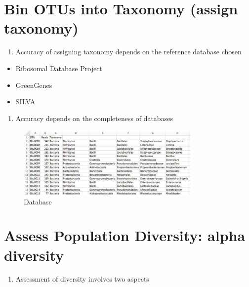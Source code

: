 \documentclass[
]{book}
\providecommand{\tightlist}{%
  \setlength{\itemsep}{0pt}\setlength{\parskip}{0pt}}
\begin{document}
\hypertarget{bin-otus-into-taxonomy-assign-taxonomy}{%
\section{Bin OTUs into Taxonomy (assign taxonomy)}\label{bin-otus-into-taxonomy-assign-taxonomy}}

\begin{enumerate}
\def\labelenumi{\arabic{enumi}.}
\tightlist
\item
  Accuracy of assigning taxonomy depends on the
  reference database chosen
\end{enumerate}

\begin{itemize}
\tightlist
\item
  Ribosomal Database Project
\item
  GreenGenes
\item
  SILVA
\end{itemize}

\begin{enumerate}
\def\labelenumi{\arabic{enumi}.}
\setcounter{enumi}{1}
\tightlist
\item
  Accuracy depends on the completeness of databases
\end{enumerate}

\begin{figure}
\centering
\includegraphics[width=0.8\textwidth,height=\textheight]{./Figures/OTU2.png}
\caption{Database}
\end{figure}

\hypertarget{assess-population-diversity-alpha-diversity}{%
\section{\texorpdfstring{Assess Population Diversity: \textbf{alpha diversity}}{Assess Population Diversity: alpha diversity}}\label{assess-population-diversity-alpha-diversity}}

\begin{enumerate}
\def\labelenumi{\arabic{enumi}.}
\tightlist
\item
  Assessment of diversity involves two aspects
\end{enumerate}
\end{document}
